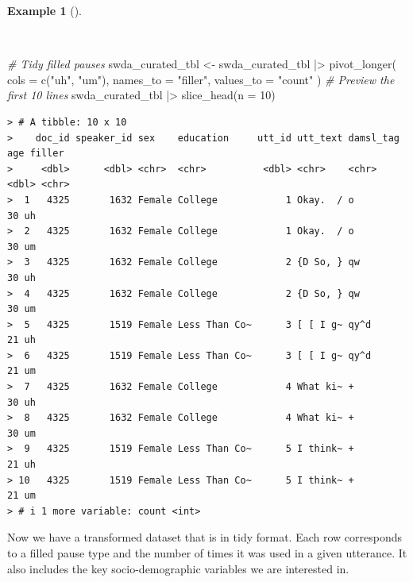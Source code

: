 \documentclass[
  letterpaper,
  DIV=11,
  numbers=noendperiod]{scrreport}
\newenvironment{Shaded}{\begin{snugshade}}{\end{snugshade}}
\newcommand{\AttributeTok}[1]{\textcolor[rgb]{0.00,0.00,0.00}{#1}}
\newcommand{\CommentTok}[1]{\textcolor[rgb]{0.00,0.00,0.00}{\textit{#1}}}
\newcommand{\DecValTok}[1]{\textcolor[rgb]{0.00,0.00,0.00}{#1}}
\newcommand{\FunctionTok}[1]{\textcolor[rgb]{0.00,0.00,0.00}{#1}}
\newcommand{\NormalTok}[1]{\textcolor[rgb]{0.00,0.00,0.00}{#1}}
\newcommand{\OtherTok}[1]{\textcolor[rgb]{0.00,0.00,0.00}{#1}}
\newcommand{\SpecialCharTok}[1]{\textcolor[rgb]{0.00,0.00,0.00}{#1}}
\newcommand{\StringTok}[1]{\textcolor[rgb]{0.00,0.00,0.00}{#1}}
\theoremstyle{definition}
\newtheorem{example}{Example}[chapter]
\theoremstyle{remark}
\begin{document}
\begin{example}[]\protect\hypertarget{exm-td-swda-recoding-filled-pauses-longer}{}\label{exm-td-swda-recoding-filled-pauses-longer}

~

\begin{Shaded}
\begin{Highlighting}[]
\CommentTok{\# Tidy filled pauses}
\NormalTok{swda\_curated\_tbl }\OtherTok{\textless{}{-}} 
\NormalTok{  swda\_curated\_tbl }\SpecialCharTok{|\textgreater{}}
  \FunctionTok{pivot\_longer}\NormalTok{(}
    \AttributeTok{cols =} \FunctionTok{c}\NormalTok{(}\StringTok{"uh"}\NormalTok{, }\StringTok{"um"}\NormalTok{), }
    \AttributeTok{names\_to =} \StringTok{"filler"}\NormalTok{, }
    \AttributeTok{values\_to =} \StringTok{"count"}
\NormalTok{  )}
\CommentTok{\# Preview the first 10 lines}
\NormalTok{swda\_curated\_tbl }\SpecialCharTok{|\textgreater{}}
  \FunctionTok{slice\_head}\NormalTok{(}\AttributeTok{n =} \DecValTok{10}\NormalTok{)}
\end{Highlighting}
\end{Shaded}

\begin{verbatim}
> # A tibble: 10 x 10
>    doc_id speaker_id sex    education     utt_id utt_text damsl_tag   age filler
>     <dbl>      <dbl> <chr>  <chr>          <dbl> <chr>    <chr>     <dbl> <chr> 
>  1   4325       1632 Female College            1 Okay.  / o            30 uh    
>  2   4325       1632 Female College            1 Okay.  / o            30 um    
>  3   4325       1632 Female College            2 {D So, } qw           30 uh    
>  4   4325       1632 Female College            2 {D So, } qw           30 um    
>  5   4325       1519 Female Less Than Co~      3 [ [ I g~ qy^d         21 uh    
>  6   4325       1519 Female Less Than Co~      3 [ [ I g~ qy^d         21 um    
>  7   4325       1632 Female College            4 What ki~ +            30 uh    
>  8   4325       1632 Female College            4 What ki~ +            30 um    
>  9   4325       1519 Female Less Than Co~      5 I think~ +            21 uh    
> 10   4325       1519 Female Less Than Co~      5 I think~ +            21 um    
> # i 1 more variable: count <int>
\end{verbatim}

\end{example}

Now we have a transformed dataset that is in tidy format. Each row
corresponds to a filled pause type and the number of times it was used
in a given utterance. It also includes the key socio-demographic
variables we are interested in.
\end{document}
